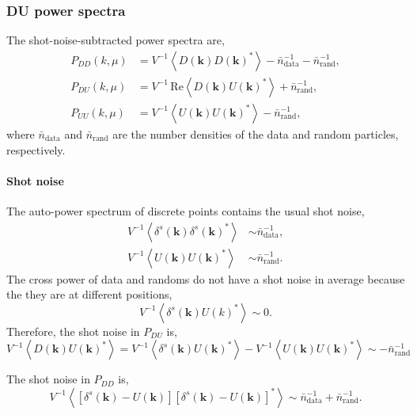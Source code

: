 \documentclass[a4paper,11pt, fleqn]{article}
\begin{document}
\vspace{2mm}
\subsubsection{DU power spectra}

The shot-noise-subtracted power spectra are,
%
\begin{align}
  P_{DD}(k, \mu) &= V^{-1} \left\langle D(\bm{k}) D(\bm{k})^* \right\rangle
                  - \bar{n}^{-1}_\mathrm{data} - \bar{n}^{-1}_\mathrm{rand},\\
  P_{DU}(k, \mu) &= V^{-1} \, \mathrm{Re}
                   \left\langle D(\bm{k}) U(\bm{k})^* \right\rangle
                   + \bar{n}^{-1}_\mathrm{rand},\\
  P_{UU}(k, \mu) &= V^{-1} \left\langle U(\bm{k}) U(\bm{k})^* \right\rangle
                  - \bar{n}^{-1}_\mathrm{rand},
\end{align}
where $\bar{n}_\mathrm{data}$ and $\bar{n}_\mathrm{rand}$ are the
number densities of the data and random particles, respectively.

\vspace{5mm}
\paragraph{Shot noise}

The auto-power spectrum of discrete points contains the usual shot
noise,
%
\begin{align}
  V^{-1} \left\langle \delta^s(\bm{k}) \delta^s(\bm{k})^* \right\rangle
  &\sim \bar{n}_\mathrm{data}^{-1},\\
  V^{-1} \left\langle U(\bm{k}) U(\bm{k})^* \right\rangle
  &\sim \bar{n}_\mathrm{rand}^{-1}.
\end{align}
%
The cross power of data and randoms do not have a shot noise in
average because the they are at different positions,
\begin{equation}
  V^{-1} \left\langle \delta^s(\bm{k}) U(k)^* \right\rangle \sim 0.
\end{equation}
%
Therefore, the shot noise in $P_{DU}$ is,
%
\begin{equation}
  V^{-1} \left\langle D(\bm{k}) U(\bm{k})^* \right\rangle
  = V^{-1} \left\langle \delta^s(\bm{k}) U(\bm{k})^* \right\rangle
    - V^{-1} \left\langle U(\bm{k}) U(\bm{k})^* \right\rangle
  \sim -\bar{n}_\mathrm{rand}^{-1}
\end{equation}
%

The shot noise in $P_{DD}$ is,
\begin{equation}
  V^{-1} \left\langle [\delta^s(\bm{k}) - U(\bm{k})]
  [\delta^s(\bm{k}) - U(\bm{k})]^* \right\rangle
  \sim \bar{n}_\mathrm{data}^{-1} + \bar{n}_\mathrm{rand}^{-1}.
\end{equation}
\end{document}
